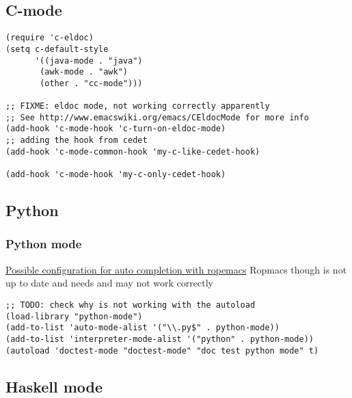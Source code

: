 \documentclass[11pt]{article}
\begin{document}
    
\subsection{C-mode}
\label{sec-31.4}

\begin{verbatim}
(require 'c-eldoc)
(setq c-default-style
      '((java-mode . "java")
       (awk-mode . "awk")
       (other . "cc-mode")))

;; FIXME: eldoc mode, not working correctly apparently
;; See http://www.emacswiki.org/emacs/CEldocMode for more info
(add-hook 'c-mode-hook 'c-turn-on-eldoc-mode)
;; adding the hook from cedet
(add-hook 'c-mode-common-hook 'my-c-like-cedet-hook)

(add-hook 'c-mode-hook 'my-c-only-cedet-hook)
\end{verbatim}
\subsection{Python}
\label{sec-31.5}
\subsubsection{Python mode}
\label{sec-31.5.1}

  \href{http://hide1713.wordpress.com/2009/01/30/setup-perfect-python-environment-in-emacs/}{Possible configuration for auto completion with ropemacs}
  Ropmacs though is not up to date and needs and may not work correctly

\begin{verbatim}
;; TODO: check why is not working with the autoload
(load-library "python-mode")
(add-to-list 'auto-mode-alist '("\\.py$" . python-mode))
(add-to-list 'interpreter-mode-alist '("python" . python-mode))
(autoload 'doctest-mode "doctest-mode" "doc test python mode" t)
\end{verbatim}
\subsection{Haskell mode}
\label{sec-31.6}
\end{document}
